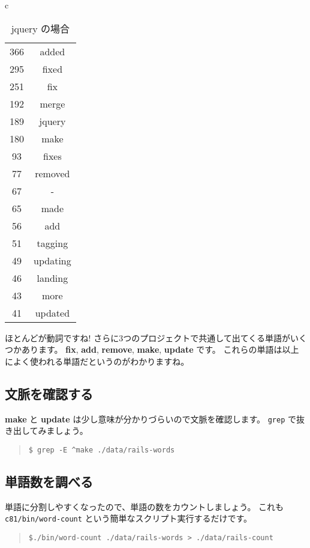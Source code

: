 \documentclass{jarticle}
\begin{document}
\begin{table}[htbp]
\begin{center}
\begin{tabular}{c}
   \begin{minipage}{0.3\hsize}
    \begin{center}
     \caption{jquery の場合}
     \begin{tabular}{c|c}
      \hline
      366 & added \\
      295 & fixed \\
      251 & fix \\
      192 & merge \\
      189 & jquery \\
      180 & make \\
      93 & fixes \\
      77 & removed \\
      67 & - \\
      65 & made \\
      56 & add \\
      51 & tagging \\
      49 & updating \\
      46 & landing \\
      43 & more \\
      41 & updated \\
      \hline
     \end{tabular}
    \end{center}
   \end{minipage}

  \end{tabular}
 \end{center}
\end{table}

ほとんどが動詞ですね!
さらに3つのプロジェクトで共通して出てくる単語がいくつかあります。
{\bf fix}, {\bf add}, {\bf remove}, {\bf make}, {\bf update} です。
これらの単語は以上によく使われる単語だというのがわかりますね。

\subsection{文脈を確認する}

{\bf make} と {\bf update} は少し意味が分かりづらいので文脈を確認します。
{\tt grep} で抜き出してみましょう。

\begin{quote}
 {\tt \$ grep -E \textasciicircum make ./data/rails-words }
\end{quote}

  \subsection{単語数を調べる}
単語に分割しやすくなったので、単語の数をカウントしましょう。
これも {\tt c81/bin/word-count} という簡単なスクリプト実行するだけです。
\begin{quote}
 {\tt \$./bin/word-count ./data/rails-words > ./data/rails-count }
\end{quote}
\end{document}
